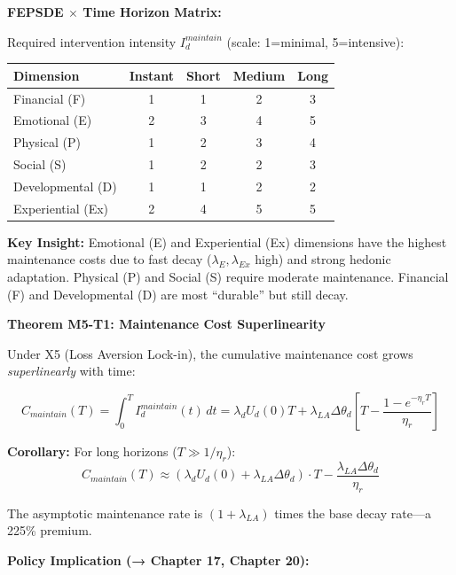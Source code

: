 \begin{tcolorbox}[colback=orange!5!white, colframe=orange!75!black,
    title=\textbf{Method UNTCM-M5: Maintenance Cost Analysis}]
\textbf{FEPSDE $\times$ Time Horizon Matrix:}

Required intervention intensity $I_d^{maintain}$ (scale: 1=minimal, 5=intensive):

\begin{center}
\renewcommand{\arraystretch}{1.2}
\begin{tabular}{@{}lcccc@{}}
\toprule
\textbf{Dimension} & \textbf{Instant} & \textbf{Short} & \textbf{Medium} & \textbf{Long} \\
\midrule
Financial (F) & 1 & 1 & 2 & 3 \\
Emotional (E) & 2 & 3 & 4 & 5 \\
Physical (P) & 1 & 2 & 3 & 4 \\
Social (S) & 1 & 2 & 2 & 3 \\
Developmental (D) & 1 & 1 & 2 & 2 \\
Experiential (Ex) & 2 & 4 & 5 & 5 \\
\bottomrule
\end{tabular}
\end{center}

\textbf{Key Insight:} Emotional (E) and Experiential (Ex) dimensions have the highest maintenance costs due to fast decay ($\lambda_E, \lambda_{Ex}$ high) and strong hedonic adaptation. Physical (P) and Social (S) require moderate maintenance. Financial (F) and Developmental (D) are most ``durable'' but still decay.

\textbf{Theorem M5-T1: Maintenance Cost Superlinearity}

Under X5 (Loss Aversion Lock-in), the cumulative maintenance cost grows \emph{superlinearly} with time:

\begin{equation}
C_{maintain}(T) = \int_0^T I_d^{maintain}(t) \, dt = \lambda_d U_d(0) T + \lambda_{LA} \Delta\theta_d \left[ T - \frac{1 - e^{-\eta_r T}}{\eta_r} \right]
\label{eq:cumulative-maintenance}
\end{equation}

\textbf{Corollary:} For long horizons ($T \gg 1/\eta_r$):
\begin{equation}
C_{maintain}(T) \approx (\lambda_d U_d(0) + \lambda_{LA} \Delta\theta_d) \cdot T - \frac{\lambda_{LA} \Delta\theta_d}{\eta_r}
\end{equation}

The asymptotic maintenance rate is $(1 + \lambda_{LA})$ times the base decay rate---a 225\% premium.

\textbf{Policy Implication (→ Chapter 17, Chapter 20):}


\end{tcolorbox}
